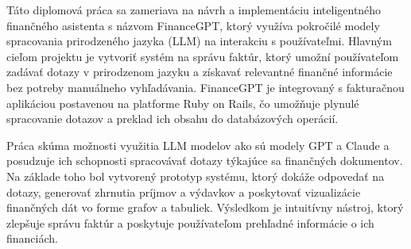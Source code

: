 Táto diplomová práca sa zameriava na návrh a implementáciu inteligentného
finančného asistenta s názvom FinanceGPT, ktorý využíva pokročilé modely spracovania
prirodzeného jazyka (LLM) na interakciu s používateľmi. Hlavným cieľom projektu
je vytvoriť systém na správu faktúr, ktorý umožní používateľom zadávať dotazy v prirodzenom
jazyku a získavať relevantné finančné informácie bez potreby manuálneho vyhľadávania.
FinanceGPT je integrovaný s fakturačnou aplikáciou postavenou na platforme Ruby
on Rails, čo umožňuje plynulé spracovanie dotazov a preklad ich obsahu do databázových
operácií.

Práca skúma možnosti využitia LLM modelov ako sú modely GPT a Claude a posudzuje ich
schopnosti spracovávať dotazy týkajúce sa finančných dokumentov. Na základe toho
bol vytvorený prototyp systému, ktorý dokáže odpovedať na dotazy, generovať
zhrnutia príjmov a výdavkov a poskytovať vizualizácie finančných dát vo forme
grafov a tabuliek. Výsledkom je intuitívny nástroj, ktorý zlepšuje správu faktúr
a poskytuje používateľom prehľadné informácie o ich financiách.